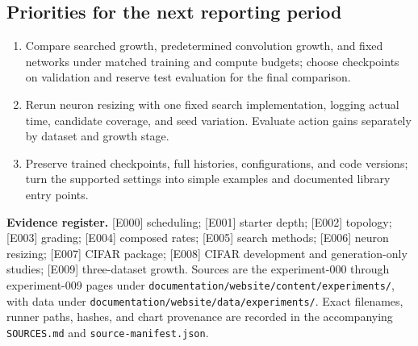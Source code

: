 \documentclass[11pt,a4paper]{article}
\begin{document}
\subsection{Priorities for the next reporting period}
\begin{enumerate}
\item Compare searched growth, predetermined convolution growth, and fixed networks under matched training and compute budgets; choose checkpoints on validation and reserve test evaluation for the final comparison.
\item Rerun neuron resizing with one fixed search implementation, logging actual time, candidate coverage, and seed variation. Evaluate action gains separately by dataset and growth stage.
\item Preserve trained checkpoints, full histories, configurations, and code versions; turn the supported settings into simple examples and documented library entry points.
\end{enumerate}

\vfill
{\footnotesize\textbf{Evidence register.} [E000] scheduling; [E001] starter depth; [E002] topology; [E003] grading; [E004] composed rates; [E005] search methods; [E006] neuron resizing; [E007] CIFAR package; [E008] CIFAR development and generation-only studies; [E009] three-dataset growth. Sources are the experiment-000 through experiment-009 pages under \texttt{documentation/website/content/experiments/}, with data under \texttt{documentation/website/data/experiments/}. Exact filenames, runner paths, hashes, and chart provenance are recorded in the accompanying \texttt{SOURCES.md} and \texttt{source-manifest.json}.}
\end{document}
